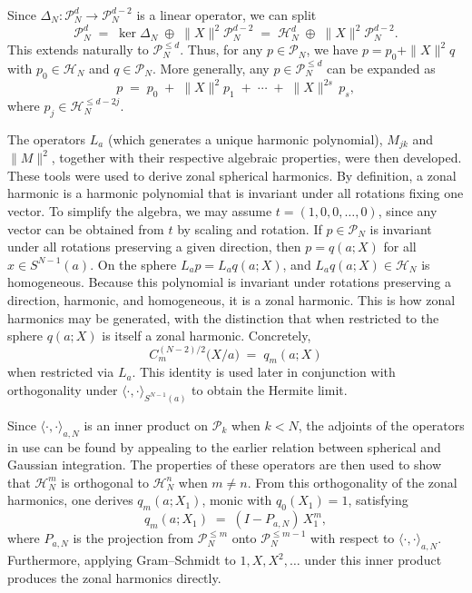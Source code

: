\documentclass[11pt]{article}
\begin{document}
Since $\Delta_N : \mathcal{P}_N^{d} \to \mathcal{P}_N^{d-2}$ is a linear
operator, we can split
\[
  \mathcal{P}_N^{d}
  \;=\; \ker \Delta_N \;\oplus\; \|X\|^2 \mathcal{P}_N^{d-2}
  \;=\; \mathcal{H}_N^{d} \;\oplus\; \|X\|^2 \mathcal{P}_N^{d-2}.
\]
This extends naturally to $\mathcal{P}_N^{\le d}$. Thus, for any
$p \in \mathcal{P}_N$, we have $p = p_0 + \|X\|^2 q$ with $p_0 \in \mathcal{H}_N$
and $q \in \mathcal{P}_N$. More generally, any $p \in \mathcal{P}_N^{\le d}$ can
be expanded as
\[
  p \;=\; p_0 \;+\; \|X\|^2 p_1 \;+\; \cdots \;+\; \|X\|^{2s}\, p_s,
\]
where $p_j \in \mathcal{H}_N^{\le d - 2j}$.

The operators $L_a$ (which generates a unique harmonic polynomial), $M_{jk}$
and $\|M\|^2$, together with their respective algebraic properties, were then
developed. These tools were used to derive zonal spherical harmonics. By
definition, a zonal harmonic is a harmonic polynomial that is invariant under
all rotations fixing one vector. To simplify the algebra, we may assume
$t = (1, 0, 0, \ldots, 0)$, since any vector can be obtained from $t$ by scaling
and rotation. If $p \in \mathcal{P}_N$ is invariant under all rotations
preserving a given direction, then $p = q(a; X)$ for all $x \in S^{N-1}(a)$.
On the sphere $L_a p = L_a q(a;X)$, and $L_a q(a;X) \in \mathcal{H}_N$ is
homogeneous. Because this polynomial is invariant under rotations preserving a
direction, harmonic, and homogeneous, it is a zonal harmonic. This is how zonal
harmonics may be generated, with the distinction that when restricted to the
sphere $q(a; X)$ is itself a zonal harmonic. Concretely,
\[
  C_m^{(N-2)/2}\!\bigl(X/a\bigr) \;=\; q_m(a; X)
\]
when restricted via $L_a$. This identity is used later in conjunction with
orthogonality under $\langle\cdot,\cdot\rangle_{S^{N-1}(a)}$ to obtain the
Hermite limit.

Since $\langle\cdot,\cdot\rangle_{a,N}$ is an inner product on $\mathcal{P}_k$
when $k < N$, the adjoints of the operators in use can be found by appealing
to the earlier relation between spherical and Gaussian integration. The
properties of these operators are then used to show that $\mathcal{H}_N^{m}$
is orthogonal to $\mathcal{H}_N^{n}$ when $m \ne n$. From this orthogonality of
the zonal harmonics, one derives $q_m(a; X_1)$, monic with $q_0(X_1) = 1$,
satisfying
\[
  q_m(a; X_1) \;=\; (I - P_{a,N})\, X_1^{m},
\]
where $P_{a,N}$ is the projection from $\mathcal{P}_N^{\le m}$ onto
$\mathcal{P}_N^{\le m - 1}$ with respect to
$\langle\cdot,\cdot\rangle_{a,N}$. Furthermore, applying Gram--Schmidt to
$1, X, X^2, \ldots$ under this inner product produces the zonal harmonics
directly.
\end{document}
